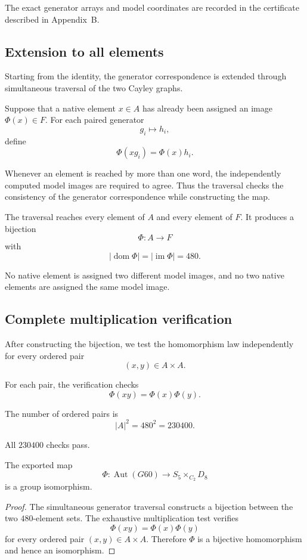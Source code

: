 The exact generator arrays and model coordinates are recorded in the
certificate described in Appendix~B.

\subsection{Extension to all elements}

Starting from the identity, the generator correspondence is extended
through simultaneous traversal of the two Cayley graphs.

Suppose that a native element $x\in A$ has already been assigned an
image $\Phi(x)\in F$. For each paired generator
\[
g_i\longmapsto h_i,
\]
define
\[
\Phi(xg_i)=\Phi(x)h_i.
\]

Whenever an element is reached by more than one word, the independently
computed model images are required to agree. Thus the traversal checks
the consistency of the generator correspondence while constructing the
map.

The traversal reaches every element of $A$ and every element of $F$.
It produces a bijection
\[
\Phi\colon A\longrightarrow F
\]
with
\[
|\operatorname{dom}\Phi|
=
|\operatorname{im}\Phi|
=
480.
\]

No native element is assigned two different model images, and no two
native elements are assigned the same model image.

\subsection{Complete multiplication verification}

After constructing the bijection, we test the homomorphism law
independently for every ordered pair
\[
(x,y)\in A\times A.
\]

For each pair, the verification checks
\[
\Phi(xy)=\Phi(x)\Phi(y).
\]

The number of ordered pairs is
\[
|A|^2
=
480^2
=
230400.
\]

All $230400$ checks pass.

\begin{theorem}
\label{thm:explicit-isomorphism}
The exported map
\[
\Phi\colon
\operatorname{Aut}(G60)
\longrightarrow
S_5\times_{C_2}D_8
\]
is a group isomorphism.
\end{theorem}

\begin{proof}
The simultaneous generator traversal constructs a bijection between the
two $480$-element sets. The exhaustive multiplication test verifies
\[
\Phi(xy)=\Phi(x)\Phi(y)
\]
for every ordered pair $(x,y)\in A\times A$. Therefore $\Phi$ is a
bijective homomorphism and hence an isomorphism.
\end{proof}

